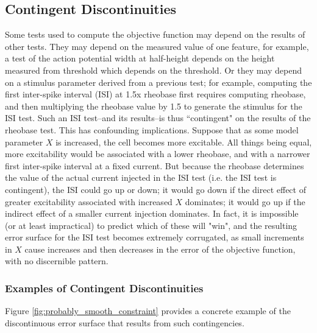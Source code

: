 \subsection{Contingent Discontinuities}
\label{fig:contingent_discontinous}
Some tests used to compute the objective function may depend on the results of other tests.
They may depend on the measured value of one feature, for example, a test of the action potential width at half-height depends on the height measured from threshold which depends on the threshold.
Or they may depend on a stimulus parameter derived from a previous test; for example, computing the first inter-spike interval (ISI) at 1.5x rheobase first requires computing rheobase, and then multiplying the rheobase value by 1.5 to generate the stimulus for the ISI test.
Such an ISI test--and its results--is thus ``contingent" on the results of the rheobase test.
This has confounding implications.
Suppose that as some model parameter $X$ is increased, the cell becomes more excitable.
All things being equal, more excitability would be associated with a lower rheobase, and with a narrower first inter-spike interval at a fixed current.
But because the rheobase determines the value of the actual current injected in the ISI test (i.e. the ISI test is contingent), the ISI could go up or down; it would go down if the direct effect of greater excitability associated with increased $X$ dominates; it would go up if the indirect effect of a smaller current injection dominates.
In fact, it is impossible (or at least impractical) to predict which of these will "win", and the resulting error surface for the ISI test becomes extremely corrugated, as small increments in $X$ cause increases and then decreases in the error of the objective function, with no discernible pattern.

\subsubsection{Examples of Contingent Discontinuities}
Figure \ref{fig:probably_smooth_constraint} provides a concrete example of the discontinuous error surface that results from such contingencies.

